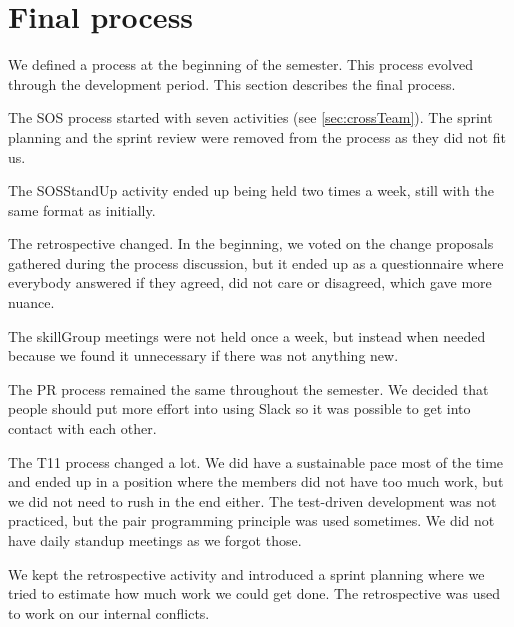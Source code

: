 \section{Final process}
We defined a process at the beginning of the semester. This process evolved through the development period. This section describes the final process. 

The \gls{SOS} process started with seven activities (see \ref{sec:crossTeam}). The sprint planning and the sprint review were removed from the process as they did not fit us. 

The \gls{SOSStandUp} activity ended up being held two times a week, still with the same format as initially. 

The retrospective changed. In the beginning, we voted on the change proposals gathered during the process discussion, but it ended up as a questionnaire where everybody answered if they agreed, did not care or disagreed, which gave more nuance.

The \gls{skillGroup} meetings were not held once a week, but instead when needed because we found it unnecessary if there was not anything new. 

The \gls{PR} process remained the same throughout the semester. We decided that people should put more effort into using Slack so it was possible to get into contact with each other. 

The \gls{T11} process changed a lot. We did have a sustainable pace most of the time and ended up in a position where the members did not have too much work, but we did not need to rush in the end either. The test-driven development was not practiced, but the pair programming principle was used sometimes. We did not have daily standup meetings as we forgot those. 

We kept the retrospective activity and introduced a sprint planning where we tried to estimate how much work we could get done. The retrospective was used to work on our internal conflicts. 
